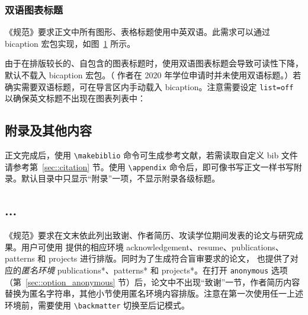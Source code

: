 \documentclass[bachelor, comfort]{shtthesis}
\begin{document}
\subsection{双语图表标题}
《规范》要求正文中所有图形、表格标题使用中英双语。此需求可以通过 \textsf{bicaption} 宏包实现，如图~\ref{img::sht_logo} 所示。
\begin{figure}[htb]
  \centering
  \label{img::sht_logo}
\end{figure}

由于在排版较长的、自包含的图表标题时，使用双语图表标题会导致可读性下降，\shtthesis{} 默认不载入 \textsf{bicaption} 宏包。（ \shtthesis{} 作者在 2020 年学位申请时并未使用双语标题。）若确实需要双语标题，可在导言区内手动载入 \textsf{bicaption}。注意需要设定 \verb|list=off| 以确保英文标题不出现在图表列表中：
\begin{latex}
\usepackage[list=off]{bicaption}
\captionsetup[figure][bi-second]{name=Figure}
\captionsetup[table][bi-second]{name=Table}
\end{latex}

\section{附录及其他内容} \label{sec::backmatter}
正文完成后，使用 \verb|\makebiblio| 命令可生成参考文献，若需读取自定义 bib 文件请参考第~\ref{sec::citation} 节。使用 \verb|\appendix| 命令后，即可像书写正文一样书写附录。默认目录中只显示“附录”一项，不显示附录各级标题。
\begin{latex}
\appendix
\chapter{...}
\end{latex}

《规范》要求在文末依此列出致谢、作者简历、攻读学位期间发表的论文与研究成果。用户可使用 \shtthesis{} 提供的相应环境 acknowledgement、resume、publications、patterns 和 projects 进行排版。同时为了生成符合盲审要求的论文，\shtthesis{} 也提供了对应的\emph{匿名环境} publications*、patterns* 和 projects*。在打开 \verb|anonymous| 选项（第~\ref{sec::option_anonymous} 节）后，论文中不出现“致谢”一节，作者简历内容替换为匿名字符串，其他小节使用匿名环境内容排版。注意在第一次使用任一上述环境前，需要使用 \verb|\backmatter| 切换至后记模式。
\end{document}

